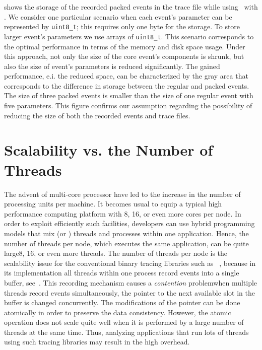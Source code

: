 \begin{landscape}


\end{landscape}

 shows the storage of the recorded packed events in 
the trace file while using \eztrace\ with \litl{}. We consider one particular 
scenario when each event's parameter can be represented by \texttt{uint8\_t};
this requires only one byte for the storage. To store larger event's parameters 
we use arrays of \texttt{uint8\_t}. This scenario corresponds to the optimal 
performance in terms of the memory and disk space usage. Under this approach, 
not only the size of the core event's components is shrunk, but also the size 
of event's parameters is reduced significantly. The gained performance, e.i. 
the reduced space, can be characterized by the gray area that corresponds to the 
difference in storage between the regular and packed events. The size of three 
packed events is smaller than the size of one regular event with five 
parameters. This figure confirms our assumption regarding the possibility of 
reducing the size of both the recorded events and trace files.


\section{Scalability vs. the Number of Threads}
The advent of multi-core processor have led to the increase in the number of 
processing units per machine. It becomes usual to equip a typical high 
performance computing platform with 8, 16, or even more cores per node. 
In order to exploit efficiently such facilities, developers can use hybrid 
programming models that mix \openmp{} (or \pthread) threads and \mpi{} 
processes within one application. Hence, the number of threads per node, which 
executes the same application, can be quite large\dash{}8, 16, or even more
threads. The number of threads per node is the scalability issue for the 
conventional binary tracing libraries such as \fxt{}~\cite{Danjean05FxT}, 
because in its implementation all threads within one process record events into 
a single buffer, see~. 
This recording mechanism causes a {\em contention} problem\dash{}when 
multiple threads record events simultaneously, the pointer to the next
available slot in the buffer is changed concurrently. The modifications of the 
pointer can be done atomically in order to preserve the data consistency. 
However, the atomic operation does not scale quite well when it is performed by 
a large number of threads at the same time. Thus, analyzing \openmp{} 
applications that run lots of threads using such tracing libraries may result 
in the high overhead.

